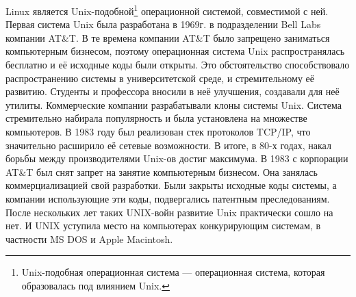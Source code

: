 \documentclass[bachelor, och, referat, times]{SCWorks}
\begin{document}
\par Linux является {Unix-подобной}\footnote{Unix-подобная операционная система — операционная система, которая образовалась под влиянием Unix.} операционной 
системой, совместимой с 
ней. Первая система Unix была разработана в 1969г. 
в подразделении Bell 
Labs компании AT\&T. В те времена компании AT\&T 
было запрещено заниматься
компьютерным бизнесом, поэтому операционная система 
Unix распространялась 
бесплатно и её исходные коды были открыты. Это 
обстоятельство 
способствовало распространению системы в 
университетской среде, и 
стремительному её развитию. Студенты и профессора 
вносили в неё улучшения,
создавали для неё утилиты. Коммерческие компании 
разрабатывали клоны 
системы Unix. Система стремительно набирала 
популярность и была 
установлена на множестве компьютеров. В 1983 году 
был реализован стек 
протоколов TCP/IP, что значительно расширило её 
сетевые возможности. В 
итоге, в 80-х годах, накал борьбы между 
производителями Unix-ов достиг 
максимума. В 1983 с корпорации AT\&T был снят 
запрет на занятие 
компьютерным бизнесом. Она занялась 
коммерциализацией свой разработки. 
Были закрыты исходные коды системы, а компании 
использующие эти коды, 
подвергались патентным преследованиям. После 
нескольких лет таких 
UNIX-войн развитие Unix практически сошло на нет. И 
UNIX уступила место на
компьютерах конкурирующим системам, в частности MS 
DOS и Apple Macintosh.
\end{document}
